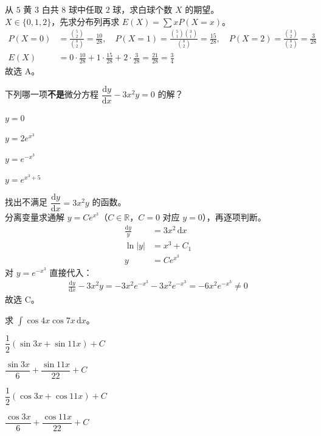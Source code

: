 \begin{solution}
    从 $5$ 黄 $3$ 白共 $8$ 球中任取 $2$ 球，求白球个数 $X$ 的期望。\\
    $X\in\{0,1,2\}$，先求分布列再求 $E(X)=\sum xP(X=x)$。\\
    \begin{align*}
        P(X=0) &=\frac{\binom52}{\binom82}=\frac{10}{28},\quad
        P(X=1)=\frac{\binom51\binom31}{\binom82}=\frac{15}{28},\quad
        P(X=2)=\frac{\binom32}{\binom82}=\frac{3}{28} \\
        E(X) &=0\cdot\frac{10}{28}+1\cdot\frac{15}{28}+2\cdot\frac{3}{28}=\frac{21}{28}=\frac34
    \end{align*}
    故选 A。
\end{solution}

\begin{question}
    下列哪一项\textbf{不是}微分方程 $\dfrac{\mathrm{d}y}{\mathrm{d}x}-3x^2y=0$ 的解？ \paren[C]
    \begin{choices}
        \item $y=0$
        \item $y=2e^{x^3}$
        \item $y=e^{-x^3}$
        \item $y=e^{x^3+5}$
    \end{choices}
\end{question}

\begin{solution}
    找出不满足 $\dfrac{\mathrm{d}y}{\mathrm{d}x}=3x^2y$ 的函数。\\
    分离变量求通解 $y=Ce^{x^3}$（$C\in\mathbb{R}$，$C=0$ 对应 $y=0$），再逐项判断。\\
    \begin{align*}
        \frac{\mathrm{d}y}{y} &=3x^2\,\mathrm{d}x \\
        \ln|y| &=x^3+C_1 \\
        y &=Ce^{x^3}
    \end{align*}
    对 $y=e^{-x^3}$ 直接代入：
    \begin{align*}
        \frac{\mathrm{d}y}{\mathrm{d}x}-3x^2y=-3x^2e^{-x^3}-3x^2e^{-x^3}=-6x^2e^{-x^3}\neq0
    \end{align*}
    故选 C。
\end{solution}

\begin{question}
    求 $\displaystyle\int\cos 4x\cos 7x\,\mathrm{d}x$。 \paren[B]
    \begin{choices}
        \item $\dfrac12(\sin3x+\sin11x)+C$
        \item $\dfrac{\sin3x}{6}+\dfrac{\sin11x}{22}+C$
        \item $\dfrac12(\cos3x+\cos11x)+C$
        \item $\dfrac{\cos3x}{6}+\dfrac{\cos11x}{22}+C$
    \end{choices}
\end{question}

